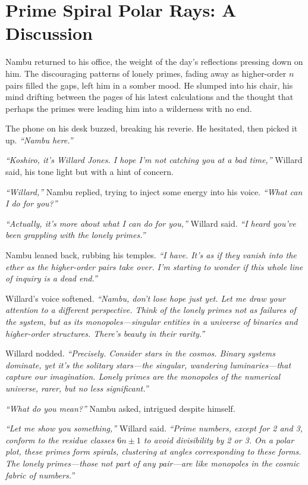 
\section*{Prime Spiral Polar Rays: A Discussion}

Nambu returned to his office, the weight of the day’s reflections pressing down on him. The discouraging patterns of lonely primes, fading away as higher-order \(n\) pairs filled the gaps, left him in a somber mood. He slumped into his chair, his mind drifting between the pages of his latest calculations and the thought that perhaps the primes were leading him into a wilderness with no end.

The phone on his desk buzzed, breaking his reverie. He hesitated, then picked it up. \textit{``Nambu here.''}

\textit{``Koshiro, it’s Willard Jones. I hope I’m not catching you at a bad time,''} Willard said, his tone light but with a hint of concern.

\textit{``Willard,''} Nambu replied, trying to inject some energy into his voice. \textit{``What can I do for you?''}

\textit{``Actually, it’s more about what I can do for you,''} Willard said. \textit{``I heard you’ve been grappling with the lonely primes.''}

Nambu leaned back, rubbing his temples. \textit{``I have. It’s as if they vanish into the ether as the higher-order pairs take over. I’m starting to wonder if this whole line of inquiry is a dead end.''}

Willard’s voice softened. \textit{``Nambu, don’t lose hope just yet. Let me draw your attention to a different perspective. Think of the lonely primes not as failures of the system, but as its monopoles—singular entities in a universe of binaries and higher-order structures. There’s beauty in their rarity.''}

Willard nodded. \textit{``Precisely. Consider stars in the cosmos. Binary systems dominate, yet it’s the solitary stars—the singular, wandering luminaries—that capture our imagination. Lonely primes are the monopoles of the numerical universe, rarer, but no less significant.''}

\textit{``What do you mean?''} Nambu asked, intrigued despite himself.

\textit{``Let me show you something,''} Willard said. \textit{``Prime numbers, except for 2 and 3, conform to the residue classes \(6n \pm 1\) to avoid divisibility by 2 or 3. On a polar plot, these primes form spirals, clustering at angles corresponding to these forms. The lonely primes—those not part of any pair—are like monopoles in the cosmic fabric of numbers.''}

